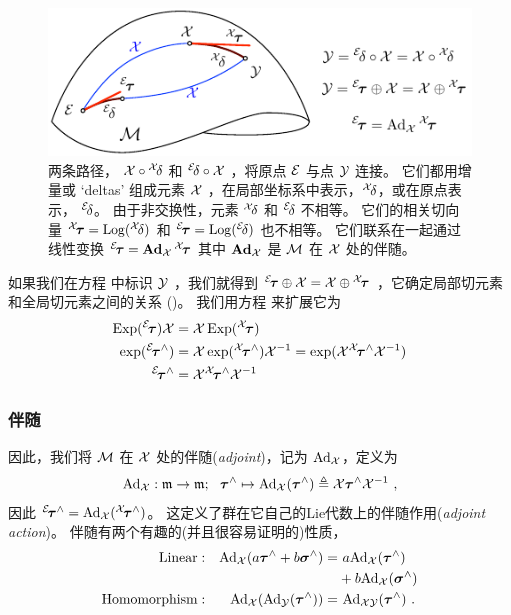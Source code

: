 \begin{figure}[tb]
\centering
\includegraphics{figures/adjoint}
\caption{两条路径， $\cX\circ{^\cX}\!\delta$ 和 ${^\cE}\!\delta\circ\cX$ ，将原点 $\cE$ 与点 $\cY$ 连接。
它们都用增量或 `deltas' 组成元素 $\cX$ ，在局部坐标系中表示，${^\cX}\!\delta$，或在原点表示， ${^\cE}\!\delta$。
由于非交换性，元素 ${^\cX}\!\delta$ 和 ${^\cE}\!\delta$ 不相等。 
它们的相关切向量 ${^\cX}\!\bftau=\Log({^\cX}\!\delta)$ 和 ${^\cE}\!\bftau=\Log({^\cE}\!\delta)$ 也不相等。
它们联系在一起通过线性变换 ${^\cE}\!\bftau=\Ad[\cM]{\cX}\,{^\cX}\!\bftau$ 其中
$\Ad{\cX}$ 是 $\cM$ 在 $\cX$ 处的伴随。 
}
\label{fig:adjoint}
\end{figure}


如果我们在方程  中标识 $\cY$ ，我们就得到 ${{^\cE\!\bftau}\op\cX} = {\cX\op{^\cX\!\bftau}}$ ，它确定局部切元素和全局切元素之间的关系 ()。
我们用方程  来扩展它为
%
\begin{align*}
\Exp({^\cE}\!\bftau)\cX 
  &= \cX\Exp({^\cX}\!\bftau) \\
\exp({^\cE}\!\bftau\hhat) 
  &= \cX \exp({^\cX}\!\bftau\hhat) \cX\inv 
   = \exp(\cX {^\cX}\!\bftau\hhat \cX\inv) \\
{^\cE}\!\bftau\hhat 
  &= \cX {^\cX}\!\bftau\hhat \cX\inv 
\end{align*}
%
\subsubsection{伴随}
因此，我们将 $\cM$ 在 $\cX$ 处的伴随(\emph{adjoint})，记为 $\Adh[\cM]{\cX}$，定义为 
%
\begin{align}
\Adh{\cX}:\frak{m}\to\frak{m};~~ \bftau\hhat\mapsto \Adh[\cM]{\cX}(\bftau\hhat) \te \cX \bftau\hhat \cX\inv \label{equ:Adjh1} 
~,
\end{align}
%
因此 ${^\cE}\!\bftau\hhat = \Adh[\cM]{\cX}({^\cX}\!\bftau\hhat)$。 
这定义了群在它自己的Lie代数上的伴随作用(\emph{adjoint action})。
伴随有两个有趣的(并且很容易证明的)性质，
%
\begin{align*}
\textrm{Linear} &:& \Adh{\cX}(a\bftau\hhat+b\bfsigma\hhat) =& ~a\Adh{\cX}(\bftau\hhat)\\
&&&+b\Adh{\cX}(\bfsigma\hhat) 
\\
\textrm{Homomorphism} &:& \Adh{\cX}(\Adh{\cY}(\bftau\hhat)) =& ~\Adh{\cX\cY}(\bftau\hhat) 
~.
\end{align*}
%
